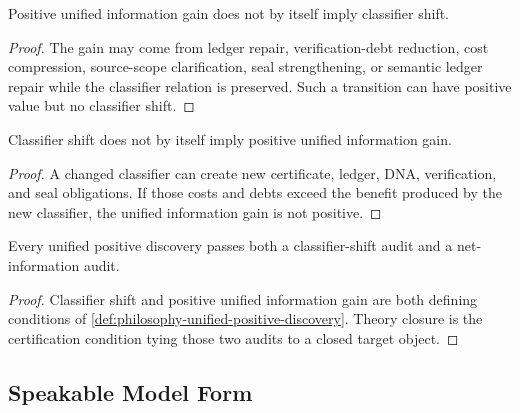 \begin{theorem}
\label{thm:philosophy-positive-uinfo-not-classifier-discovery}
Positive unified information gain does not by itself imply classifier
shift.
\end{theorem}
\begin{proof}
The gain may come from ledger repair, verification-debt reduction, cost
compression, source-scope clarification, seal strengthening, or semantic
ledger repair while the classifier relation is preserved. Such a
transition can have positive value but no classifier shift.
\end{proof}

\begin{theorem}
\label{thm:philosophy-classifier-shift-not-positive-uinfo}
Classifier shift does not by itself imply positive unified information
gain.
\end{theorem}
\begin{proof}
A changed classifier can create new certificate, ledger, DNA,
verification, and seal obligations. If those costs and debts exceed the
benefit produced by the new classifier, the unified information gain is
not positive.
\end{proof}

\begin{theorem}
\label{thm:philosophy-unified-positive-discovery-two-audits}
Every unified positive discovery passes both a classifier-shift audit and
a net-information audit.
\end{theorem}
\begin{proof}
Classifier shift and positive unified information gain are both defining
conditions of
\autoref{def:philosophy-unified-positive-discovery}. Theory closure is
the certification condition tying those two audits to a closed target
object.
\end{proof}

\subsection{Speakable Model Form}
\label{subsec:philosophy-speakable-model-form}

